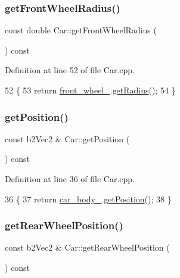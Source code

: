 \subsubsection{\texorpdfstring{get\+Front\+Wheel\+Radius()}{getFrontWheelRadius()}}
{\footnotesize\ttfamily const double Car\+::get\+Front\+Wheel\+Radius (\begin{DoxyParamCaption}{ }\end{DoxyParamCaption}) const}



Definition at line 52 of file Car.\+cpp.


\begin{DoxyCode}
52                                             \{
53     \textcolor{keywordflow}{return} \hyperlink{classCar_a9c6abcefc82b364b09e67fad1b200beb}{front\_wheel\_}.\hyperlink{classWheel_a224ac73d325efb3cdc389a36d54ca10b}{getRadius}();
54 \}
\end{DoxyCode}
\mbox{\label{classCar_aedf5fdf009d300cd2dc7faa51f30224b}} 
\subsubsection{\texorpdfstring{get\+Position()}{getPosition()}}
{\footnotesize\ttfamily const b2\+Vec2 \& Car\+::get\+Position (\begin{DoxyParamCaption}{ }\end{DoxyParamCaption}) const}



Definition at line 36 of file Car.\+cpp.


\begin{DoxyCode}
36                                      \{
37     \textcolor{keywordflow}{return} \hyperlink{classCar_a6a0d40752a134fb4f0693a28a4e64a0d}{car\_body\_}.\hyperlink{classCarBody_aa58f688a6f2ae687870daa41b73db625}{getPosition}();
38 \}
\end{DoxyCode}
\mbox{\label{classCar_a66a6f10dda6b6f5a58126d58eba6f2d0}} 
\subsubsection{\texorpdfstring{get\+Rear\+Wheel\+Position()}{getRearWheelPosition()}}
{\footnotesize\ttfamily const b2\+Vec2 \& Car\+::get\+Rear\+Wheel\+Position (\begin{DoxyParamCaption}{ }\end{DoxyParamCaption}) const}



